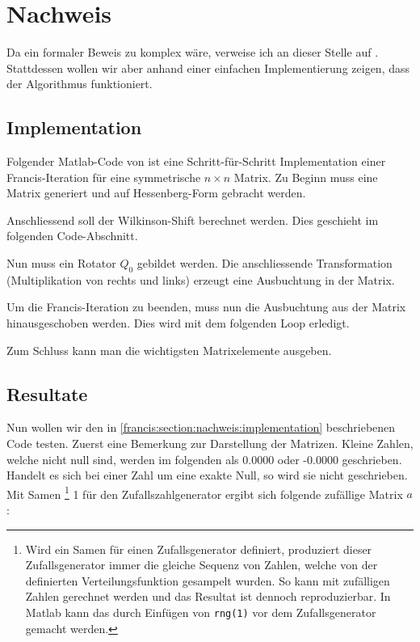\section{Nachweis\label{francis:section:nachweis}}

Da ein formaler Beweis zu komplex wäre, verweise ich an dieser Stelle auf \cite{francis:watkins_book}.
Stattdessen wollen wir aber anhand einer einfachen Implementierung zeigen, dass der Algorithmus funktioniert.

\subsection{Implementation\label{francis:section:nachweis:implementation}}
Folgender Matlab-Code von \cite{francis:watkins_book} ist eine Schritt-für-Schritt Implementation einer Francis-Iteration für eine symmetrische $n \times n$ Matrix.
Zu Beginn muss eine Matrix generiert und auf Hessenberg-Form gebracht werden.

Anschliessend soll der Wilkinson-Shift berechnet werden.
Dies geschieht im folgenden Code-Abschnitt.

Nun muss ein Rotator $Q_0$ gebildet werden.
Die anschliessende Transformation (Multiplikation von rechts und links) erzeugt eine Ausbuchtung in der Matrix.

Um die Francis-Iteration zu beenden, muss nun die Ausbuchtung aus der Matrix hinausgeschoben werden.
Dies wird mit dem folgenden Loop erledigt.

Zum Schluss kann man die wichtigsten Matrixelemente ausgeben.


\subsection{Resultate\label{francis:section:nachweis:resultate}}
Nun wollen wir den in \ref{francis:section:nachweis:implementation} beschriebenen Code testen.
Zuerst eine Bemerkung zur Darstellung der Matrizen. 
Kleine Zahlen, welche nicht null sind, werden im folgenden als 0.0000 oder -0.0000 geschrieben.
Handelt es sich bei einer Zahl um eine exakte Null, so wird sie nicht geschrieben.
Mit Samen \footnote{Wird ein Samen für einen Zufallsgenerator definiert, produziert dieser Zufallsgenerator immer die gleiche Sequenz von Zahlen, welche von der definierten Verteilungsfunktion gesampelt wurden.
So kann mit zufälligen Zahlen gerechnet werden und das Resultat ist dennoch reproduzierbar.
In Matlab kann das durch Einfügen von \texttt{rng(1)} vor dem Zufallsgenerator gemacht werden.}
1 für den Zufallszahlgenerator ergibt sich folgende zufällige Matrix $a$:

